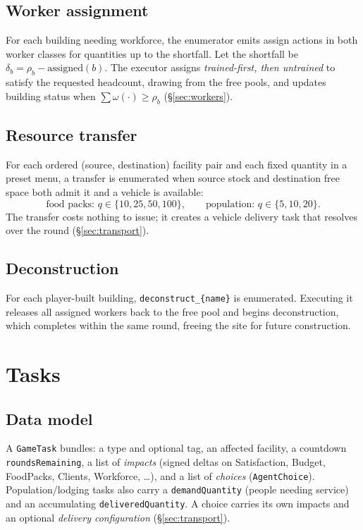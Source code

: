 \documentclass[11pt]{article}
\newcommand{\code}[1]{\texttt{\small #1}}
\begin{document}
\subsection{Worker assignment}
For each building needing workforce, the enumerator emits assign actions in both
worker classes for quantities up to the shortfall. Let the shortfall be
$\delta_b = \rho_b - \text{assigned}(b)$. The executor assigns
\emph{trained-first, then untrained} to satisfy the requested headcount, drawing
from the free pools, and updates building status when
$\sum \omega(\cdot) \geq \rho_b$ (\S\ref{sec:workers}).

\subsection{Resource transfer}
For each ordered (source, destination) facility pair and each fixed quantity in a
preset menu, a transfer is enumerated when source stock and destination free
space both admit it and a vehicle is available:
\[
\text{food packs: } q \in \{10,25,50,100\}, \qquad
\text{population: } q \in \{5,10,20\}.
\]
The transfer costs nothing to issue; it creates a vehicle delivery task that
resolves over the round (\S\ref{sec:transport}).

\subsection{Deconstruction}
For each player-built building, \code{deconstruct\_\{name\}} is enumerated.
Executing it releases all assigned workers back to the free pool and begins
deconstruction, which completes within the same round, freeing the site for
future construction.

\section{Tasks}
\label{sec:tasks}

\subsection{Data model}
A \code{GameTask} bundles: a type and optional tag, an affected facility, a
countdown \code{roundsRemaining}, a list of \emph{impacts}
(signed deltas on Satisfaction, Budget, FoodPacks, Clients, Workforce, \dots),
and a list of \emph{choices} (\code{AgentChoice}). Population/lodging tasks also
carry a \code{demandQuantity} (people needing service) and an accumulating
\code{deliveredQuantity}. A choice carries its own impacts and an optional
\emph{delivery configuration} (\S\ref{sec:transport}).
\end{document}
